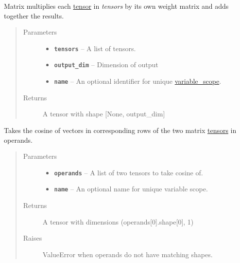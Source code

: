 \documentclass[letterpaper,10pt,english]{sphinxmanual}
\begin{document}
\begin{fulllineitems}
\label{node_ops:node_ops.concat}
Matrix multiplies each \href{https://www.tensorflow.org/versions/r0.7/api\_docs/python/framework.html\#Tensor}{tensor} in \emph{tensors} by its own weight matrix and adds together the results.
\begin{quote}\begin{description}
\item[{Parameters}] \leavevmode\begin{itemize}
\item {} 
\textbf{\texttt{tensors}} -- A list of tensors.

\item {} 
\textbf{\texttt{output\_dim}} -- Dimension of output

\item {} 
\textbf{\texttt{name}} -- An optional identifier for unique \href{https://www.tensorflow.org/versions/r0.7/how\_tos/variable\_scope/index.html}{variable\_scope}.

\end{itemize}

\item[{Returns}] \leavevmode
A tensor with shape {[}None, output\_dim{]}

\end{description}\end{quote}

\end{fulllineitems}


\begin{fulllineitems}
\label{node_ops:node_ops.cosine}
Takes the cosine of vectors in corresponding rows of the two matrix \href{https://www.tensorflow.org/versions/r0.7/api\_docs/python/framework.html\#Tensor}{tensors} in operands.
\begin{quote}\begin{description}
\item[{Parameters}] \leavevmode\begin{itemize}
\item {} 
\textbf{\texttt{operands}} -- A list of two tensors to take cosine of.

\item {} 
\textbf{\texttt{name}} -- An optional name for unique variable scope.

\end{itemize}

\item[{Returns}] \leavevmode
A tensor with dimensions (operands{[}0{]}.shape{[}0{]}, 1)

\item[{Raises}] \leavevmode
ValueError when operands do not have matching shapes.

\end{description}\end{quote}

\end{fulllineitems}
\end{document}

